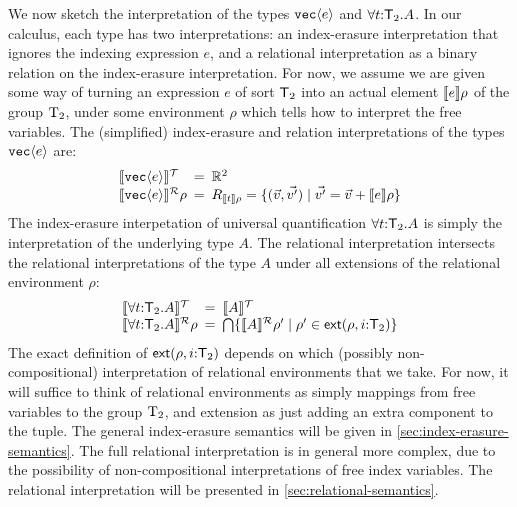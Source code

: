 We now sketch the interpretation of the types $\texttt{vec}\langle e \rangle$ and
$\forall t\mathord:\mathsf{T}_2.A$. In our calculus, each type has two
interpretations: an index-erasure interpretation that ignores the
indexing expression $e$, and a relational interpretation as a binary
relation on the index-erasure interpretation. For now, we assume we
are given some way of turning an expression $e$ of sort $\mathsf{T}_2$
into an actual element $\llbracket e \rrbracket\rho$ of the group $\mathrm{T}_2$, under
some environment $\rho$ which tells how to interpret the free
variables. The (simplified) index-erasure and relation interpretations
of the types $\texttt{vec}\langle e \rangle$ are:
\begin{displaymath}
  \begin{array}{l@{\hspace{0.5em}=\hspace{0.5em}}l}
    \tySem{\tyPrim{vec}{e}} & \mathbb{R}^2 \\
    \rsem{\tyPrim{vec}{e}}{}\rho & R_{\sem{t}\rho} = \{ (\vec{v},\vec{v'}) \sepbar \vec{v'} = \vec{v} + \sem{e}\rho \}
  \end{array}
\end{displaymath}
The index-erasure interpetation of universal quantification $\forall
t\mathord:\mathsf{T}_2.A$ is simply the interpretation of the
underlying type $A$. The relational interpretation intersects the
relational interpretations of the type $A$ under all extensions of the
relational environment $\rho$:
\begin{displaymath}
  \begin{array}{l@{\hspace{0.5em}=\hspace{0.5em}}l}
    \tySem{\forall t\mathord:\SynTransl_2.A} & \tySem{A} \\
    \rsem{\forall t\mathord:\SynTransl_2.A}{}\rho & \bigcap\{ \rsem{A}{}{\rho'} \sepbar \rho' \in \extends{\rho}{i\mathord:\SynTransl_2} \}
  \end{array}
\end{displaymath}
The exact definition of $\mathsf{ext}(\rho,i\mathord:\mathsf{T}_2)$
depends on which (possibly non-compositional) interpretation of
relational environments that we take. For now, it will suffice to
think of relational environments as simply mappings from free
variables to the group $\mathrm{T}_2$, and extension as just adding an
extra component to the tuple. The general index-erasure semantics will
be given in \autoref{sec:index-erasure-semantics}. The full relational
interpretation is in general more complex, due to the possibility of
non-compositional interpretations of free index variables. The
relational interpretation will be presented in
\autoref{sec:relational-semantics}.

